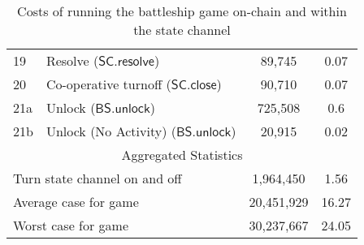 \documentclass{llncs}
\newcommand{\statechannelresolve}{\mathsf{SC}.\mathsf{resolve}}
\newcommand{\statechannelclose}{\mathsf{SC}.\mathsf{close}}
\newcommand{\battleshipunlock}{\mathsf{BS.unlock}}
\begin{document}
\begin{table}
\begin{tabular}[]{l l c c}
		19 & Resolve ($\statechannelresolve$) &89,745 & 0.07 \\
		20 & Co-operative turnoff ($\statechannelclose$) & 90,710 & 0.07 \\
		21a & Unlock ($\battleshipunlock$) & 725,508 & 0.6 \\
		21b & Unlock (No Activity) ($\battleshipunlock$) & 20,915 & 0.02 \\
		\hline
		\multicolumn{4}{c}{Aggregated Statistics} \\
		\hline
		\multicolumn{2}{l}{Turn state channel on and off} & 1,964,450  & 1.56 \\
		\multicolumn{2}{l}{Average case for game} & 20,451,929 & 16.27 \\
		\multicolumn{2}{l}{Worst case for game} & 30,237,667 & 24.05 \\
		\hline 
	\end{tabular}
	
	\caption{Costs of running the battleship game on-chain and within the state channel}\label{tab:costs}
\end{table}
\end{document}
